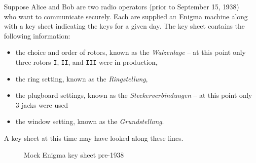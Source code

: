 Suppose Alice and Bob are two radio operators (prior to September 15,
1938) who want to communicate securely. Each are supplied an Enigma
machine along with a key sheet indicating the keys for a given day.
The key sheet contains the following information:
\begin{itemize}
  \item the choice and order of rotors, known as the \emph{Walzenlage} -- at this point only three
      rotors \texttt{I}, \texttt{II}, and \texttt{III} were in
    production,
  \item the ring setting, known as the \emph{Ringstellung},
  \item the plugboard settings, known as the \emph{Steckerverbindungen} -- at this point only 3 jacks were used
    
  \item the window setting, known as the \emph{Grundstellung}.
\end{itemize}
A key sheet at this time may have looked along these lines.

\begin{figure}[H]
  \begin{center}
  \end{center}
  \caption{Mock Enigma key sheet pre-1938}
  \label{fig:keysheet_early}
\end{figure}

